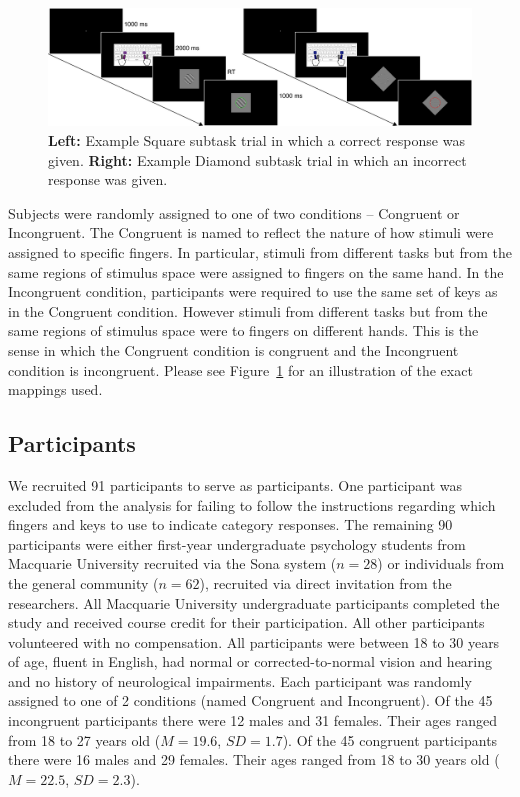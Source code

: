 \documentclass[doc, floatsintext]{apa7}
\begin{document}
\begin{figure}[h!]
    \centering
    \includegraphics[width=\textwidth]{../figures/fig_example_trials.png}
    \caption{
    \textbf{Left:} Example Square subtask trial in which a
    correct response was given.  \textbf{Right:} Example
    Diamond subtask trial in which an incorrect response was
    given.
}
    \label{fig_example_trials.png}
\end{figure}

Subjects were randomly assigned to one of two conditions --
Congruent or Incongruent.  The
Congruent is named to reflect the nature of how
stimuli were assigned to specific fingers. In particular,
stimuli from different tasks but from the same regions of
stimulus space were assigned to fingers on the same hand.
In the Incongruent condition, participants were
required to use the same set of keys as in the
Congruent condition.  However stimuli from
different tasks but from the same regions of stimulus space
were to fingers on different hands.  This is the sense in
which the Congruent condition is congruent and the
Incongruent condition is incongruent.  Please see
Figure~\ref{fig_example_trials.png} for an illustration
of the exact mappings used.

\subsection{Participants}
We recruited 91 participants to serve as participants.   One
participant was excluded from the analysis for failing to
follow the instructions regarding which fingers and keys to
use to indicate category responses. The remaining 90
participants were either first-year undergraduate psychology
students from Macquarie University recruited via the Sona
system ($n = 28$) or individuals from the general community
($n = 62$), recruited via direct invitation from the
researchers. All Macquarie University undergraduate
participants completed the study and received course credit
for their participation.  All other participants volunteered
with no compensation. All participants were between 18 to 30
years of age, fluent in English, had normal or
corrected-to-normal vision and hearing and no history of
neurological impairments. Each participant was randomly
assigned to one of 2 conditions (named Congruent and
Incongruent).  Of the 45 incongruent participants there were
12 males and 31 females. Their ages ranged from 18 to 27
years old ($M = 19.6$, $SD = 1.7$).  Of the 45 congruent
participants there were 16 males and 29 females. Their ages
ranged from 18 to 30 years old ($M = 22.5$, $SD = 2.3$).  
\end{document}

